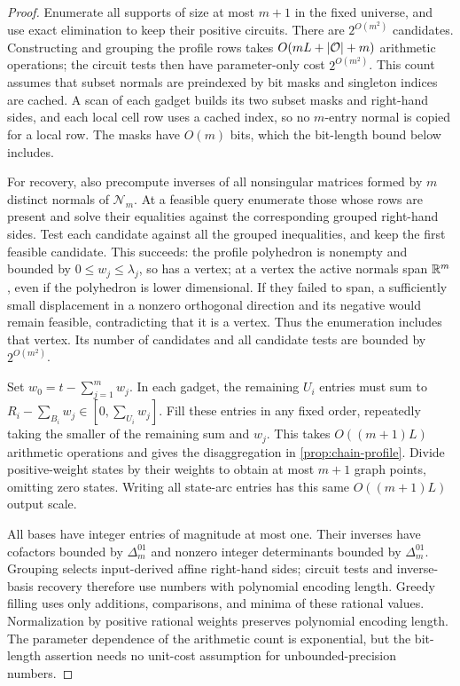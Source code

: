 \begin{proof}
Enumerate all supports of size at most $m+1$ in the fixed universe,
and use exact elimination to keep their positive circuits. There
are $2^{O(m^2)}$ candidates. Constructing and grouping the profile
rows takes $O(mL+|\mathcal O|+m)$ arithmetic operations; the circuit
tests then have parameter-only cost $2^{O(m^2)}$.
This count assumes that subset normals are preindexed by bit masks and
singleton indices are cached. A scan of each gadget builds its two
subset masks and right-hand sides, and each local cell row uses a
cached index, so no $m$-entry normal is copied for a local row. The
masks have $O(m)$ bits, which the bit-length bound below includes.

For recovery, also precompute inverses of all nonsingular matrices
formed by $m$ distinct normals of $\mathcal N_m$. At a feasible
query enumerate those whose rows are present and solve their
equalities against the corresponding grouped right-hand sides.
Test each candidate against all the grouped inequalities, and keep
the first feasible candidate. This succeeds: the profile polyhedron
is nonempty and bounded by $0\le w_j\le\lambda_j$, so has a
vertex; at a vertex the active normals span $\mathbb R^m$, even if the
polyhedron is lower dimensional. If they failed to span, a sufficiently
small displacement in a nonzero orthogonal direction and its negative
would remain feasible, contradicting that it is a vertex. Thus the
enumeration includes that vertex. Its number of candidates and all
candidate tests are bounded by $2^{O(m^2)}$.

Set $w_0=t-\sum_{j=1}^mw_j$. In each gadget, the remaining
$U_i$ entries must sum to
$R_i-\sum_{B_i}w_j\in[0,\sum_{U_i}w_j]$. Fill these entries
in any fixed order, repeatedly taking the smaller of the remaining
sum and $w_j$. This takes $O((m+1)L)$ arithmetic operations and
gives the disaggregation in \cref{prop:chain-profile}. Divide
positive-weight states by their weights to obtain at most $m+1$
graph points, omitting zero states. Writing all state-arc entries
has this same $O((m+1)L)$ output scale.

All bases have integer entries of magnitude at most one. Their
inverses have cofactors bounded by $\Delta^{01}_m$ and nonzero integer
determinants bounded by $\Delta^{01}_m$. Grouping selects input-derived
affine right-hand sides; circuit tests and inverse-basis recovery
therefore use numbers with polynomial encoding length. Greedy filling
uses only additions, comparisons, and minima of these rational values.
Normalization by positive rational weights preserves polynomial
encoding length. The parameter dependence of the arithmetic count is
exponential, but the bit-length assertion needs no unit-cost assumption
for unbounded-precision numbers.
\end{proof}

